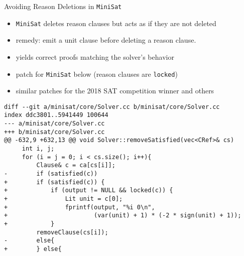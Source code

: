 \documentclass[final,hyperref={pdfpagelabels=true}]{beamer}
\begin{document}
\begin{frame}[fragile]
\begin{columns}[t]
\begin{column}{.45\textwidth}
    \begin{block}{Avoiding Reason Deletions in \texttt{MiniSat}}
	\begin{itemize}
	    \item \texttt{MiniSat} deletes reason clauses but acts as if
	    they are not deleted
            \item remedy: emit a unit clause before deleting a reason clause.
            \item yields correct proofs matching the solver's behavior
            \item patch for \texttt{MiniSat} below (reason clauses are
            \texttt{locked})
            \item similar patches for the 2018 SAT competition winner
            and others
	\end{itemize}
	\vspace{1cm}
        {\footnotesize
            \begin{verbatim}
diff --git a/minisat/core/Solver.cc b/minisat/core/Solver.cc
index ddc3801..5941449 100644
--- a/minisat/core/Solver.cc
+++ b/minisat/core/Solver.cc
@@ -632,9 +632,13 @@ void Solver::removeSatisfied(vec<CRef>& cs)
     int i, j;
     for (i = j = 0; i < cs.size(); i++){
         Clause& c = ca[cs[i]];
-        if (satisfied(c))
+        if (satisfied(c)) {
+            if (output != NULL && locked(c)) {
+                Lit unit = c[0];
+                fprintf(output, "%i 0\n",
+                        (var(unit) + 1) * (-2 * sign(unit) + 1));
+            }
         removeClause(cs[i]);
-        else{
+        } else{
            \end{verbatim}
        }
    \end{block}
    \end{column}


\end{columns}
\end{frame}
\end{document}
